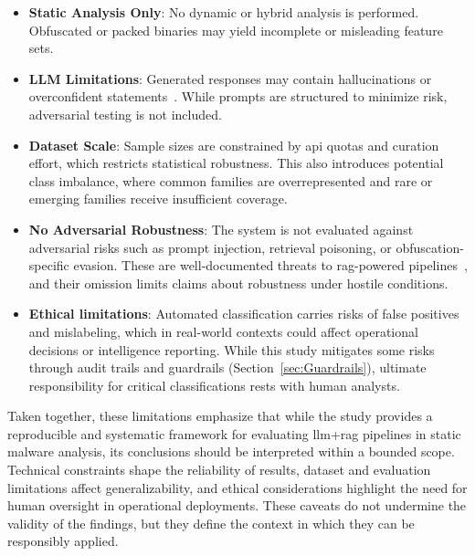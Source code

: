 \begin{itemize}
      \item \textbf{Static Analysis Only}: No dynamic or hybrid analysis is performed.
            Obfuscated or packed binaries may yield incomplete or misleading feature sets.

      \item \textbf{LLM Limitations}: Generated responses may contain hallucinations or
            overconfident statements~\cite{zou2024poisonedrag, ferrag2024allinsights}.
            While prompts are structured to minimize risk, adversarial testing is not included.

      \item \textbf{Dataset Scale}: Sample sizes are constrained by \gls{api} quotas and curation effort,
            which restricts statistical robustness. This also introduces potential class imbalance,
            where common families are overrepresented and rare or emerging families receive
            insufficient coverage.

      \item \textbf{No Adversarial Robustness}: The system is not evaluated against adversarial
            risks such as prompt injection, retrieval poisoning, or obfuscation-specific evasion.
            These are well-documented threats to \gls{rag}-powered pipelines~\cite{zou2024poisonedrag},
            and their omission limits claims about robustness under hostile conditions.

      \item \textbf{Ethical limitations}: Automated classification carries risks of false
            positives and mislabeling, which in real-world contexts could affect operational
            decisions or intelligence reporting. While this study mitigates some risks through
            audit trails and guardrails (Section~\ref{sec:Guardrails}), ultimate responsibility
            for critical classifications rests with human analysts.
\end{itemize}

Taken together, these limitations emphasize that while the study provides a reproducible and
systematic framework for evaluating \gls{llm}+\gls{rag} pipelines in static malware analysis, its
conclusions should be interpreted within a bounded scope. Technical constraints shape the
reliability of results, dataset and evaluation limitations affect generalizability, and ethical
considerations highlight the need for human oversight in operational deployments. These caveats do
not undermine the validity of the findings, but they define the context in which they can be
responsibly applied.

